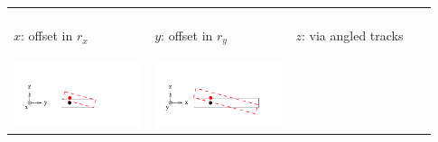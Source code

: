\documentclass[compress]{beamer}
\begin{document}
\begin{frame}
\begin{center}
\begin{tabular}{p{0.31\linewidth} p{0.31\linewidth} p{0.31\linewidth}}
\begin{minipage}{\linewidth}
  \end{minipage} \\
  \begin{minipage}{\linewidth}
    \begin{center}
      $x$: offset in $r_x$
    \end{center}
  \end{minipage} &
  \begin{minipage}{\linewidth}
    \begin{center}
      $y$: offset in $r_y$
    \end{center}
  \end{minipage} &
  \begin{minipage}{\linewidth}
    \begin{center}
      $z$: via angled tracks
    \end{center}
  \end{minipage} \\
  \begin{minipage}{\linewidth}
    \tiny
    \includegraphics[width=\linewidth]{dof_phix.pdf}
  \end{minipage} &
  \begin{minipage}{\linewidth}
    \tiny
    \includegraphics[width=\linewidth]{dof_phiy.pdf}
  \end{minipage} &

\end{tabular}
\end{center}
\end{frame}
\end{document}
